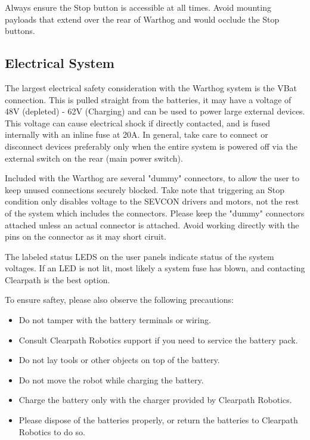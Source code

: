 \documentclass[]{clearpath-latex/clearpath-manual}
\begin{document}
Always ensure the Stop button is accessible at all times. Avoid mounting payloads that extend over the rear of Warthog and would occlude the Stop buttons.

\subsection{Electrical System}

The largest electrical safety consideration with the Warthog system is the VBat connection. This is pulled straight from the batteries, it may have a voltage of 48V (depleted) - 62V (Charging) and can be used to power large external devices. This voltage can cause electrical shock if directly contacted, and is fused internally with an inline fuse at 20A. In general, take care to connect or disconnect devices preferably only when the entire system is powered off via the external switch on the rear (main power switch).

Included with the Warthog are several "dummy" connectors, to allow the user to keep unused connections securely blocked. Take note that triggering an Stop condition only disables voltage to the SEVCON drivers and motors, not the rest of the system which includes the connectors.  Please keep the "dummy" connectors attached unless an actual connector is attached.  Avoid working directly with the pins on the connector as it may short ciruit.

The labeled status LEDS on the user panels indicate status of the system voltages. If an LED is not lit, most likely a system fuse has blown, and contacting Clearpath is the best option.

To ensure saftey, please also observe the following precautions:

\begin{itemize}[nolistsep]
  \item Do not tamper with the battery terminals or wiring.
  \item Consult Clearpath Robotics support if you need to service the battery pack.
  \item Do not lay tools or other objects on top of the battery.
  \item Do not move the robot while charging the battery.
  \item Charge the battery only with the charger provided by Clearpath Robotics.
  \item Please dispose of the batteries properly, or return the batteries to Clearpath Robotics to do so.
\end{itemize}
\end{document}
